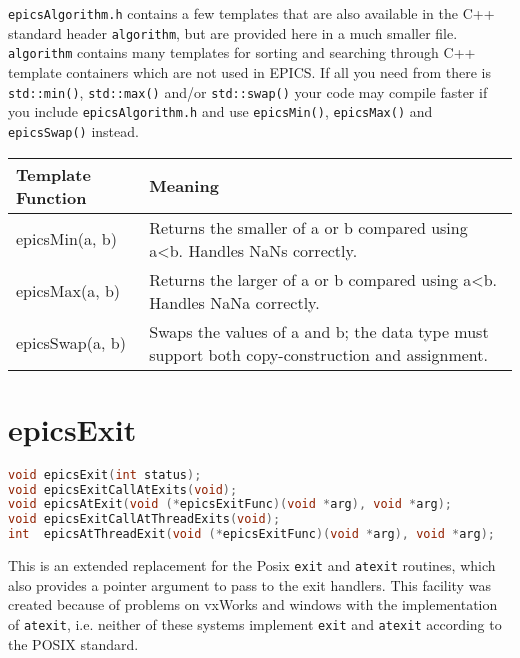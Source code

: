 \verb|epicsAlgorithm.h| contains a few templates that are also available in the C++ standard header \verb|algorithm|, but are provided here in a much smaller file.
\verb|algorithm| contains many templates for sorting and searching through C++ template containers which are not used in EPICS.
If all you need from there is \verb|std::min()|, \verb|std::max()| and/or \verb|std::swap()| your code may compile faster if you include \verb|epicsAlgorithm.h| and use \verb|epicsMin()|, \verb|epicsMax()| and \verb|epicsSwap()| instead.

\begin{center}
\begin{longtable}{p{1.5in}p{4.25in}}
\textbf{Template Function} & \textbf{Meaning}\\
\hline
epicsMin(a, b) & Returns the smaller of a or b compared using a\textless{}b. Handles NaNs correctly.\\
epicsMax(a, b) & Returns the larger of a or b compared using a\textless{}b. Handles NaNa correctly.\\
epicsSwap(a, b) & Swaps the values of a and b; the data type must support both copy-construction and assignment.
\end{longtable}

\end{center}


\section{epicsExit}

\begin{lstlisting}[language=C]
void epicsExit(int status);
void epicsExitCallAtExits(void);
void epicsAtExit(void (*epicsExitFunc)(void *arg), void *arg);
void epicsExitCallAtThreadExits(void);
int  epicsAtThreadExit(void (*epicsExitFunc)(void *arg), void *arg);
\end{lstlisting}

This is an extended replacement for the Posix \verb|exit| and \verb|atexit| routines, which also provides a pointer argument to pass to the exit handlers.
This facility was created because of problems on vxWorks and windows with the implementation of \verb|atexit|, i.e. neither of these systems implement \verb|exit| and \verb|atexit| according to the POSIX standard.

